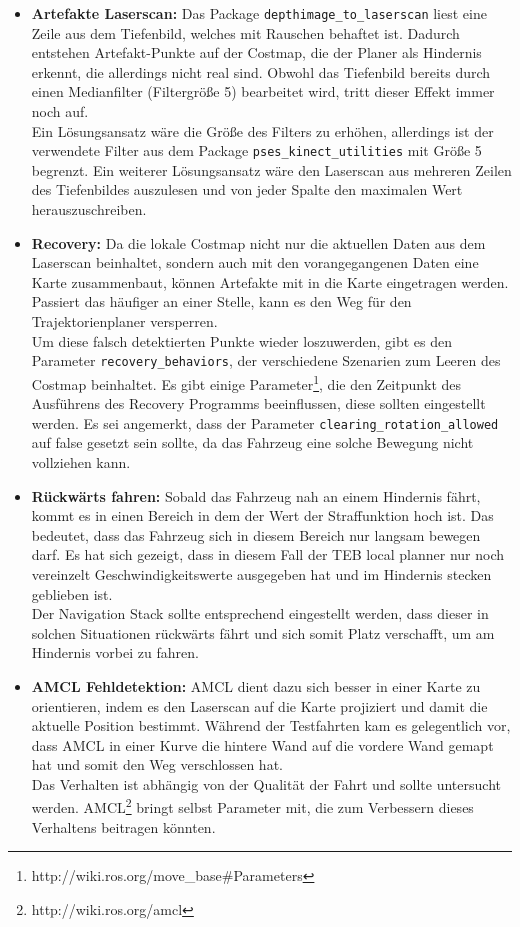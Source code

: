 \begin{itemize}
	\item \textbf{Artefakte Laserscan:} Das Package \texttt{depthimage\_to\_laserscan} liest eine Zeile aus dem Tiefenbild, welches mit Rauschen behaftet ist. Dadurch entstehen Artefakt-Punkte auf der Costmap, die der Planer als Hindernis erkennt, die allerdings nicht real sind. Obwohl das Tiefenbild bereits durch einen Medianfilter (Filtergr\"o\ss{}e 5) bearbeitet wird, tritt dieser Effekt immer noch auf. \\
	Ein L\"osungsansatz w\"are die Gr\"o\ss{}e des Filters zu erh\"ohen, allerdings ist der verwendete Filter aus dem Package \texttt{pses\_kinect\_utilities} mit Gr\"o\ss{}e 5 begrenzt. Ein weiterer L\"osungsansatz w\"are den Laserscan aus mehreren Zeilen des Tiefenbildes auszulesen und von jeder Spalte den maximalen Wert herauszuschreiben. 
	\item \textbf{Recovery:} Da die lokale Costmap nicht nur die aktuellen Daten aus dem Laserscan beinhaltet, sondern auch mit den vorangegangenen Daten eine Karte zusammenbaut, k\"onnen Artefakte mit in die Karte eingetragen werden. Passiert das h\"aufiger an einer Stelle, kann es den Weg f\"ur den Trajektorienplaner versperren.\\
	Um diese falsch detektierten Punkte wieder loszuwerden, gibt es den Parameter \texttt{recovery\_behaviors}, der verschiedene Szenarien zum Leeren des Costmap beinhaltet. Es gibt einige Parameter\footnote{http://wiki.ros.org/move\_base\#Parameters}, die den Zeitpunkt des Ausf\"uhrens des Recovery Programms beeinflussen, diese sollten eingestellt werden. Es sei angemerkt, dass der Parameter \texttt{clearing\_rotation\_allowed} auf false gesetzt sein sollte, da das Fahrzeug eine solche Bewegung nicht vollziehen kann.
	\item \textbf{R\"uckw\"arts fahren:} Sobald das Fahrzeug nah an einem Hindernis f\"ahrt, kommt es in einen Bereich in dem der Wert der Straffunktion hoch ist. Das bedeutet, dass das Fahrzeug sich in diesem Bereich nur langsam bewegen darf. Es hat sich gezeigt, dass in diesem Fall der TEB local planner nur noch vereinzelt Geschwindigkeitswerte ausgegeben hat und im Hindernis stecken geblieben ist.\\
	Der Navigation Stack sollte entsprechend eingestellt werden, dass dieser in solchen Situationen r\"uckw\"arts f\"ahrt und sich somit Platz verschafft, um am Hindernis vorbei zu fahren.
	\item \textbf{AMCL Fehldetektion:} AMCL dient dazu sich besser in einer Karte zu orientieren, indem es den Laserscan auf die Karte projiziert und damit die aktuelle Position bestimmt. W\"ahrend der Testfahrten kam es gelegentlich vor, dass AMCL in einer Kurve die hintere Wand auf die vordere Wand gemapt hat und somit den Weg verschlossen hat.\\
	Das Verhalten ist abh\"angig von der Qualit\"at der Fahrt und sollte untersucht werden. AMCL\footnote{http://wiki.ros.org/amcl} bringt selbst Parameter mit, die zum Verbessern dieses Verhaltens beitragen k\"onnten.
\end{itemize}